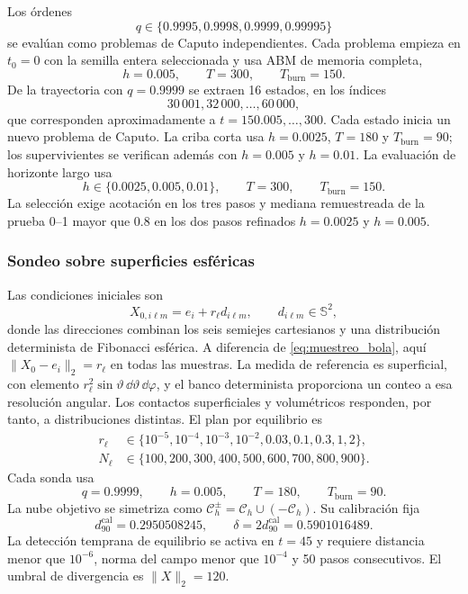 Los órdenes
\[
q\in\{0.9995,0.9998,0.9999,0.99995\}
\]
se evalúan como problemas de Caputo independientes. Cada problema empieza en
\(t_0=0\) con la semilla entera seleccionada y usa ABM de memoria completa,
\[
h=0.005,\qquad T=300,\qquad T_{\mathrm{burn}}=150.
\]
De la trayectoria con \(q=0.9999\) se extraen 16 estados, en los índices
\[
30\,001,32\,000,\ldots,60\,000,
\]
que corresponden aproximadamente a \(t=150.005,\ldots,300\). Cada estado
inicia un nuevo problema de Caputo. La criba corta usa \(h=0.0025\),
\(T=180\) y \(T_{\mathrm{burn}}=90\); los supervivientes se verifican además
con \(h=0.005\) y \(h=0.01\). La evaluación de horizonte largo usa
\[
h\in\{0.0025,0.005,0.01\},\qquad
T=300,\qquad T_{\mathrm{burn}}=150.
\]
La selección exige acotación en los tres pasos y mediana remuestreada de la
prueba 0--1 mayor que 0.8 en los dos pasos refinados
\(h=0.0025\) y \(h=0.005\).

\subsubsection{Sondeo sobre superficies esféricas}

Las condiciones iniciales son
\begin{equation}
X_{0,i\ell m}=e_i+r_\ell d_{i\ell m},
\qquad d_{i\ell m}\in\mathbb S^2,
\label{eq:muestreo_superficie_c590}
\end{equation}
donde las direcciones combinan los seis semiejes cartesianos y una
distribución determinista de Fibonacci esférica. A diferencia de
\cref{eq:muestreo_bola}, aquí \(\|X_0-e_i\|_2=r_\ell\) en todas las
muestras. La medida de referencia es superficial, con elemento
\(r_\ell^2\sin\vartheta\,\dd\vartheta\,\dd\varphi\), y el banco
determinista proporciona un conteo a esa resolución angular. Los contactos
superficiales y volumétricos responden, por tanto, a distribuciones distintas.
El plan por equilibrio es
\begin{equation}
\begin{aligned}
r_\ell&\in\{10^{-5},10^{-4},10^{-3},10^{-2},0.03,0.1,0.3,1,2\},\\
N_\ell&\in\{100,200,300,400,500,600,700,800,900\}.
\end{aligned}
\label{eq:plan_superficies_c590}
\end{equation}
Cada sonda usa
\[
q=0.9999,\qquad h=0.005,\qquad
T=180,\qquad T_{\mathrm{burn}}=90.
\]
La nube objetivo se simetriza como
\(\mathcal C_h^\pm=\mathcal C_h\cup(-\mathcal C_h)\). Su calibración fija
\begin{equation}
d_{90}^{\mathrm{cal}}=0.2950508245,\qquad
\delta=2d_{90}^{\mathrm{cal}}=0.5901016489.
\label{eq:umbral_c590}
\end{equation}
La detección temprana de equilibrio se activa en \(t=45\) y requiere distancia
menor que \(10^{-6}\), norma del campo menor que \(10^{-4}\) y 50 pasos
consecutivos. El umbral de divergencia es \(\|X\|_2=120\).

